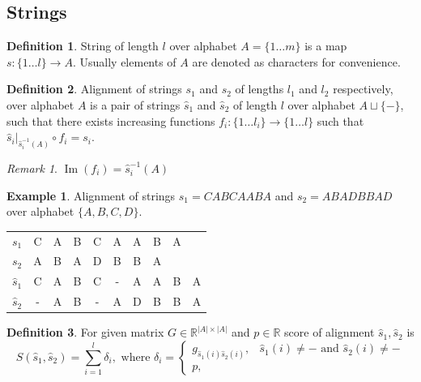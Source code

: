 \documentclass[a4paper, 12pt]{article}
\DeclareMathOperator{\Image}{Im}
\theoremstyle{definition}
\newtheorem{definition}{Definition}[section]
\theoremstyle{definition}
\newtheorem{example}{Example}[section]
\theoremstyle{remark}
\newtheorem*{remark}{Remark}
\begin{document}
\subsection{Strings}

\begin{definition}
    String of length $l$ over alphabet $A = \{ 1 \ldots m \}$ is a map $s: \{ 1 \ldots l\} \rightarrow A$.
    Usually elements of $A$ are denoted as characters for convenience.
\end{definition}

\begin{definition}
    Alignment of strings $s_1$ and $s_2$ of lengths $l_1$ and $l_2$ respectively, 
    over alphabet $A$ is a pair of strings $\hat{s}_1$ and $\hat{s}_2$ 
    of length $l$ over alphabet $A \sqcup \{ - \}$, 
    such that there exists increasing functions $f_i: \{1 \ldots l_i \} \rightarrow \{ 1 \ldots l\}$ 
    such that $\hat{s}_i|_{\hat{s}_i^{-1} (A)} \circ f_i = s_i$.
\end{definition}

\begin{remark}
    $\Image (f_i) = \hat{s}_i^{-1}(A)$
\end{remark}

\begin{example}
    Alignment of strings $s_1 = CABCAABA$ and $s_2 = ABADBBAD$ 
    over alphabet $\{ A, B, C, D\}$.

    \begin{center}
        \begin{tabular}{|| c | c c c c c c c c c ||}
         $s_1$ & C & A & B & C & A & A & B & A & \\ 
         $s_2$ & A & B & A & D & B & B & A &   & \\  
         $\hat{s}_1$ & C & A & B & C & - & A & A & B & A \\ 
         $\hat{s}_2$ & - & A & B & - & A & D & B & B & A   
        \end{tabular}
    \end{center}
\end{example}

\begin{definition}
    For given matrix $G \in \mathbb{R}^{|A| \times |A|}$ and $p \in \mathbb{R}$ 
    score of alignment $\hat{s}_1, \hat{s}_2$ is 
    $$ S(\hat{s}_1, \hat{s}_2) = \sum_{i = 1}^l \delta_i, 
        \text{ where } 
        \delta_{i}=
            \left\{\begin{array}{cc}
            g_{\hat{s}_1(i) \hat{s}_2(i)},& \hat{s}_1(i) \neq - \text{ and } \hat{s}_2(i) \neq -\\
            p, & 
            \end{array}\right. 
    $$
\end{definition}
\end{document}

